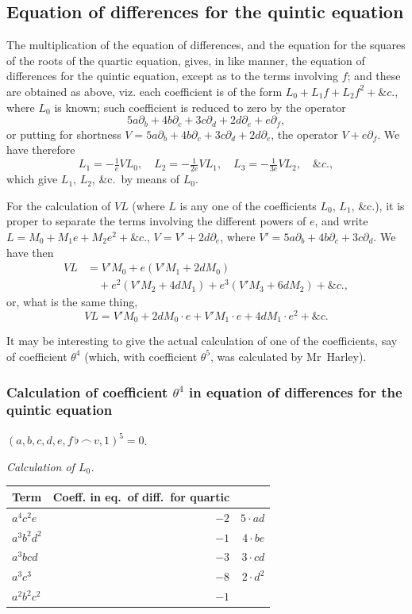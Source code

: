 \documentclass[11pt,a4paper]{article}
\theoremstyle{definition}
\begin{document}
\subsection*{Equation of differences for the quintic equation}

The multiplication of the equation of differences, and the equation for the squares of the roots of the quartic equation, gives, in like manner, the equation of differences for the quintic equation, except as to the terms involving $f$; and these are obtained as above, viz. each coefficient is of the form $L_0+L_1f+L_2f^2+\&c.$, where $L_0$ is known; such coefficient is reduced to zero by the operator
\[
5a\partial_b+4b\partial_c+3c\partial_d+2d\partial_e+e\partial_f,
\]
or putting for shortness $V=5a\partial_b+4b\partial_c+3c\partial_d+2d\partial_e$, the operator $V+e\partial_f$. We have therefore
\[
L_1=-\tfrac{1}{e}VL_0,\quad L_2=-\tfrac{1}{2e}VL_1,\quad L_3=-\tfrac{1}{3e}VL_2,\quad \&c.,
\]
which give $L_1$, $L_2$, \&c.\ by means of $L_0$.

For the calculation of $VL$ (where $L$ is any one of the coefficients $L_0$, $L_1$, \&c.), it is proper to separate the terms involving the different powers of $e$, and write $L=M_0+M_1e+M_2e^2+\&c.$, $V=V'+2d\partial_e$, where $V'=5a\partial_b+4b\partial_c+3c\partial_d$. We have then
\begin{align*}
VL &= V'M_0+e(V'M_1+2dM_0)\\
&\quad+e^2(V'M_2+4dM_1)+e^3(V'M_3+6dM_2)+\&c.,
\end{align*}
or, what is the same thing,
\[
VL=V'M_0+2dM_0\cdot e+V'M_1\cdot e+4dM_1\cdot e^2+\&c.
\]

It may be interesting to give the actual calculation of one of the coefficients, say of coefficient $\theta^4$ (which, with coefficient $\theta^5$, was calculated by Mr~Harley).

\subsubsection*{Calculation of coefficient $\theta^4$ in equation of differences for the quintic equation}

$(a,b,c,d,e,f\,\flat\,\frown\, v,1)^5=0$.

\textit{Calculation of $L_0$.}
\begin{center}
\begin{tabular}{lrr}
\toprule
Term & Coeff. in eq.\ of diff.\ for quartic & \\
\midrule
$a^4c^2e$ & $-2$ & $5\cdot ad$\\
$a^3b^2d^2$ & $-1$ & $4\cdot be$\\
$a^3bcd$ & $-3$ & $3\cdot cd$\\
$a^3c^3$ & $-8$ & $2\cdot d^2$\\
$a^2b^2c^2$ & $-1$ & \\
\bottomrule
\end{tabular}
\end{center}
\end{document}
